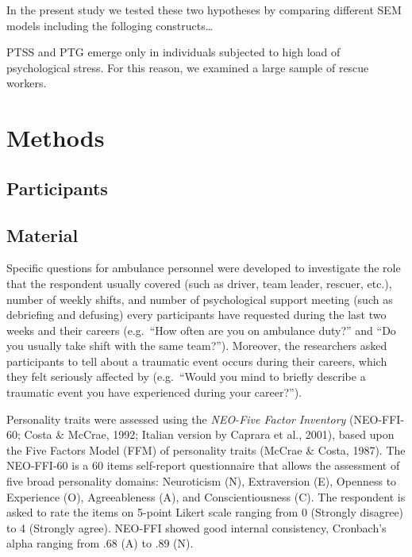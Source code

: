 \documentclass[
  english,
  man,floatsintext]{apa7}
\begin{document}
In the present study we tested these two hypotheses by comparing different SEM models including the folloging constructs\ldots{}

PTSS and PTG emerge only in individuals subjected to high load of psychological stress.
For this reason, we examined a large sample of rescue workers.

\hypertarget{methods}{%
\section{Methods}\label{methods}}

\hypertarget{participants}{%
\subsection{Participants}\label{participants}}

\hypertarget{material}{%
\subsection{Material}\label{material}}

Specific questions for ambulance personnel were developed to investigate the role that the respondent usually covered (such as driver, team leader, rescuer, etc.), number of weekly shifts, and number of psychological support meeting (such as debriefing and defusing) every participants have requested during the last two weeks and their careers (e.g.~``How often are you on ambulance duty?'' and ``Do you usually take shift with the same team?'').
Moreover, the researchers asked participants to tell about a traumatic event occurs during their careers, which they felt seriously affected by (e.g.~``Would you mind to briefly describe a traumatic event you have experienced during your career?'').

Personality traits were assessed using the \emph{NEO-Five Factor Inventory} (NEO-FFI-60; Costa \& McCrae, 1992; Italian version by Caprara et al., 2001), based upon the Five Factors Model (FFM) of personality traits (McCrae \& Costa, 1987).
The NEO-FFI-60 is a 60 items self-report questionnaire that allows the assessment of five broad personality domains: Neuroticism (N), Extraversion (E), Openness to Experience (O), Agreeableness (A), and Conscientiousness (C).
The respondent is asked to rate the items on 5-point Likert scale ranging from 0 (Strongly disagree) to 4 (Strongly agree).
NEO-FFI showed good internal consistency, Cronbach's alpha ranging from .68 (A) to .89 (N).
\end{document}
